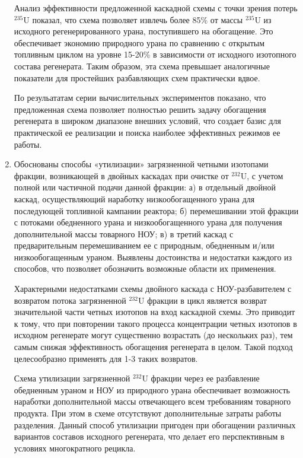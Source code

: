 \begin{enumerate}[label=\Roman*.]
Анализ эффективности предложенной каскадной схемы с точки зрения потерь $^{235}$U показал, что схема позволяет извлечь более 85\% от массы $^{235}$U из исходного регенерированного урана, поступившего на обогащение. Это обеспечивает экономию природного урана по сравнению с открытым топливным циклом на уровне 15-20\% в зависимости от исходного изотопного состава регенерата. Таким образом, эта схема превышает аналогичные показатели для простейших разбавляющих схем практически вдвое.

По резульататам серии вычислительных экспериментов показано, что предложенная схема позволяет полностью решить задачу обогащения регенерата в широком диапазоне внешних условий, что создает базис для практической ее реализации и поиска наиболее эффективных режимов ее работы.

\item Обоснованы способы «утилизации» загрязненной четными изотопами фракции, возникающей в двойных каскадах при очистке от $^{232}$U, с учетом полной или частичной подачи данной фракции: а) в отдельный двойной каскад, осуществляющий наработку низкообогащенного урана для последующей топливной кампании реактора; б) перемешивании этой фракции с потоками обедненного урана и низкообогащенного урана для получения дополнительной массы товарного НОУ; в) в третий каскад с предварительным перемешиванием ее с природным, обедненным и/или низкообогащенным ураном. Выявлены достоинства и недостатки каждого из способов, что позволяет обозначить возможные области их применения.
 
Характерными недостатками схемы двойного каскада с НОУ-разбавителем с возвратом потока загрязненной $^{232}$U фракции в цикл является возврат значительной части четных изотопов на вход каскадной схемы. Это приводит к тому, что при повторении такого процесса концентрации четных изотопов в исходном регенерате могут существенно возрастать (до нескольких раз), тем самым снижая эффективность обогащения регенерата в целом. Такой подход целесообразно применять для 1-3 таких возвратов.
 
Схема утилизации загрязненной $^{232}$U фракции через ее разбавление обедненным ураном и НОУ из природного урана обеспечивает возможность наработки дополнительной массы отвечающего всем требованиям товарного продукта. При этом в схеме отсутствуют дополнительные затраты работы разделения. Данный способ утилизации пригоден при обогащении различных вариантов составов исходного регенерата, что делает его перспективным в условиях многократного рецикла.


\end{enumerate}
